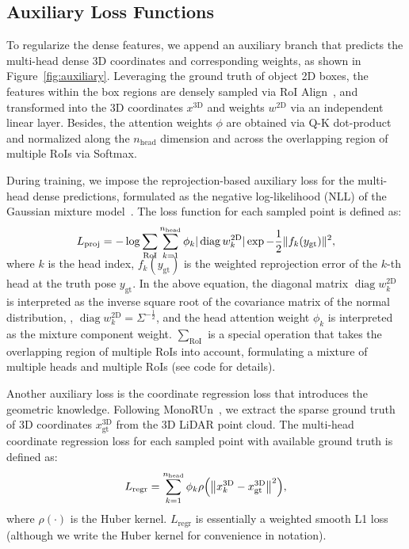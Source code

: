 \documentclass[10pt,twocolumn,letterpaper]{article}
\let\originalleft\left
\let\originalright\right
\renewcommand{\left}{\mathopen{}\mathclose\bgroup\originalleft}
\renewcommand{\right}{\aftergroup\egroup\originalright}
\newcommand{\diag}{\mathop{\mathrm{diag}}}
\begin{document}
\subsection{Auxiliary Loss Functions}

To regularize the dense features, we append an auxiliary branch that predicts the multi-head dense 3D coordinates and corresponding weights, as shown in Figure~\ref{fig:auxiliary}. Leveraging the ground truth of object 2D boxes, the features within the box regions are densely sampled via RoI Align~\cite{maskrcnn}, and transformed into the 3D coordinates $x^\text{3D}$ and weights $w^\text{2D}$ via an independent linear layer. Besides, the attention weights $\phi$ are obtained via Q-K dot-product and normalized along the $n_\text{head}$ dimension and across the overlapping region of multiple RoIs via Softmax. 

During training, we impose the reprojection-based auxiliary loss for the multi-head dense predictions, formulated as the negative log-likelihood (NLL) of the Gaussian mixture model~\cite{Bishop94mixturedensity}. The loss function for each sampled point is defined as:
\vspace{-1ex}
\begin{equation}
    L_\text{proj} = \smash[b]{-\log \sum_{\text{RoI}}\sum_{k=1}^{n_\text{head}} \phi_k |\diag{w_k^\text{2D}}| \exp{-\frac{1}{2}\|f_k(y_\text{gt})\|^2}} ,
    \vspace{1mm}
    \label{auxreproj}
\end{equation}
where $k$ is the head index, $f_k(y_\text{gt})$ is the weighted reprojection error of the $k$-th head at the truth pose $y_\text{gt}$. In the above equation, the diagonal matrix $\diag{w_k^\text{2D}}$ is interpreted as the inverse square root of the covariance matrix of the normal distribution, \ie, $\diag{w_k^\text{2D}} = \Sigma^{-\frac{1}{2}}$, and the head attention weight $\phi_k$ is interpreted as the mixture component weight. $\sum_{\text{RoI}}$ is a special operation that takes the overlapping region of multiple RoIs into account, formulating a mixture of multiple heads and multiple RoIs (see code for details).

Another auxiliary loss is the coordinate regression loss that introduces the geometric knowledge. Following MonoRUn~\cite{monorun}, we extract the sparse ground truth of 3D coordinates $x^\text{3D}_\text{gt}$ from the 3D LiDAR point cloud. The multi-head coordinate regression loss for each sampled point with available ground truth is defined as:
\begin{equation}
    L_\text{regr} = \sum_{k=1}^{n_\text{head}} \phi_k \rho\left(\left\| x^\text{3D}_k - x^\text{3D}_\text{gt} \right\|^2\right),
\end{equation}
where $\rho(\cdot)$ is the Huber kernel. $L_\text{regr}$ is essentially a weighted smooth L1 loss (although we write the Huber kernel for convenience in notation).
\end{document}
